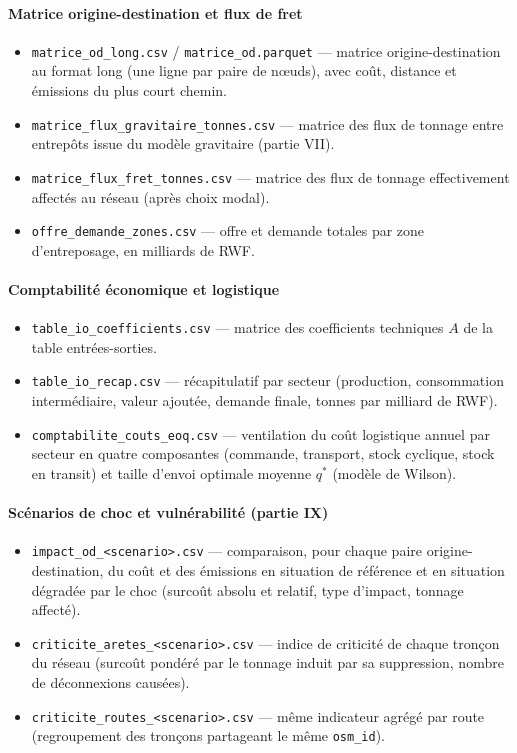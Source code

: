 \documentclass[12pt,a4paper,french]{report}
\begin{document}
		\paragraph{Matrice origine-destination et flux de fret}
		\begin{itemize}
			\item \texttt{matrice\_od\_long.csv} / \texttt{matrice\_od.parquet} — matrice origine-destination au format long (une ligne par paire de nœuds), avec coût, distance et émissions du plus court chemin.
			\item \texttt{matrice\_flux\_gravitaire\_tonnes.csv} — matrice des flux de tonnage entre entrepôts issue du modèle gravitaire (partie VII).
			\item \texttt{matrice\_flux\_fret\_tonnes.csv} — matrice des flux de tonnage effectivement affectés au réseau (après choix modal).
			\item \texttt{offre\_demande\_zones.csv} — offre et demande totales par zone d'entreposage, en milliards de RWF.
		\end{itemize}

		\paragraph{Comptabilité économique et logistique}
		\begin{itemize}
			\item \texttt{table\_io\_coefficients.csv} — matrice des coefficients techniques $A$ de la table entrées-sorties.
			\item \texttt{table\_io\_recap.csv} — récapitulatif par secteur (production, consommation intermédiaire, valeur ajoutée, demande finale, tonnes par milliard de RWF).
			\item \texttt{comptabilite\_couts\_eoq.csv} — ventilation du coût logistique annuel par secteur en quatre composantes (commande, transport, stock cyclique, stock en transit) et taille d'envoi optimale moyenne $q^*$ (modèle de Wilson).
		\end{itemize}

		\paragraph{Scénarios de choc et vulnérabilité (partie IX)}
		\begin{itemize}
			\item \texttt{impact\_od\_<scenario>.csv} — comparaison, pour chaque paire origine-destination, du coût et des émissions en situation de référence et en situation dégradée par le choc (surcoût absolu et relatif, type d'impact, tonnage affecté).
			\item \texttt{criticite\_aretes\_<scenario>.csv} — indice de criticité de chaque tronçon du réseau (surcoût pondéré par le tonnage induit par sa suppression, nombre de déconnexions causées).
			\item \texttt{criticite\_routes\_<scenario>.csv} — même indicateur agrégé par route (regroupement des tronçons partageant le même \texttt{osm\_id}).
		\end{itemize}
\end{document}
